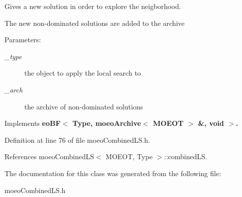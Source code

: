 Gives a new solution in order to explore the neigborhood. 

The new non-dominated solutions are added to the archive \begin{Desc}
\item[Parameters:]
\begin{description}
\item[{\em \_\-type}]the object to apply the local search to \item[{\em \_\-arch}]the archive of non-dominated solutions \end{description}
\end{Desc}


Implements \bf{eo\-BF$<$ Type, moeo\-Archive$<$ MOEOT $>$ \&, void $>$}.

Definition at line 76 of file moeo\-Combined\-LS.h.

References moeo\-Combined\-LS$<$ MOEOT, Type $>$::combined\-LS.

The documentation for this class was generated from the following file:\begin{CompactItemize}
\item 
moeo\-Combined\-LS.h\end{CompactItemize}
